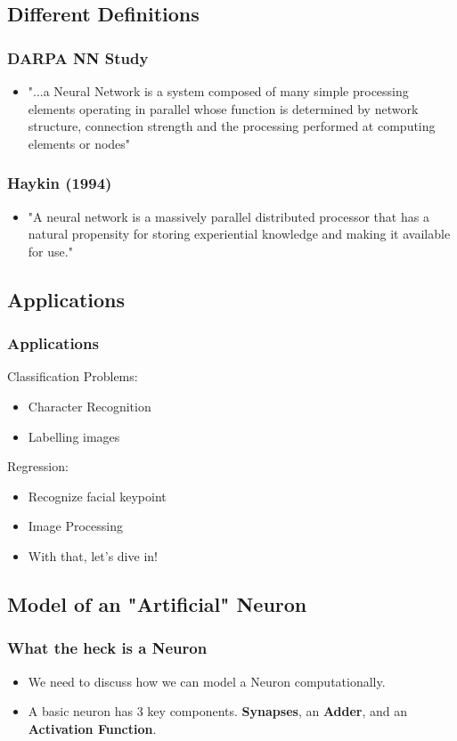 \documentclass{beamer}
\begin{document}
\subsection{Different Definitions}
\begin{frame}
\frametitle{DARPA NN Study}
\begin{itemize}
	\item "...a Neural Network is a system composed of many simple processing elements operating in parallel whose function is determined by network structure, connection strength and the processing performed at computing elements or nodes"
\end{itemize}
\end{frame}

\begin{frame}
\frametitle{Haykin (1994)}
\begin{itemize}
\item "A neural network is a massively parallel distributed processor that has a natural propensity for storing experiential knowledge and making it available for use."
\end{itemize}
\end{frame}
\subsection{Applications}
\begin{frame}
\frametitle{Applications}
Classification Problems:
\begin{itemize}
\item  Character Recognition
\item Labelling images
\end{itemize}
Regression:
\begin{itemize}
\item Recognize facial keypoint
\item Image Processing
\end{itemize}
\end{frame}

\begin{frame}
\begin{itemize}
\item With that, let's dive in!
\end{itemize}
\end{frame}
\subsection{Model of an "Artificial" Neuron}
\begin{frame}
\frametitle{What the heck is a Neuron}
\begin{itemize}
	\item We need to discuss how we can model a Neuron computationally. 
    \item A basic neuron has 3 key components. \textbf{Synapses}, an \textbf{Adder}, and an \textbf{Activation Function}.
\end{itemize}

\end{frame}
\end{document}
